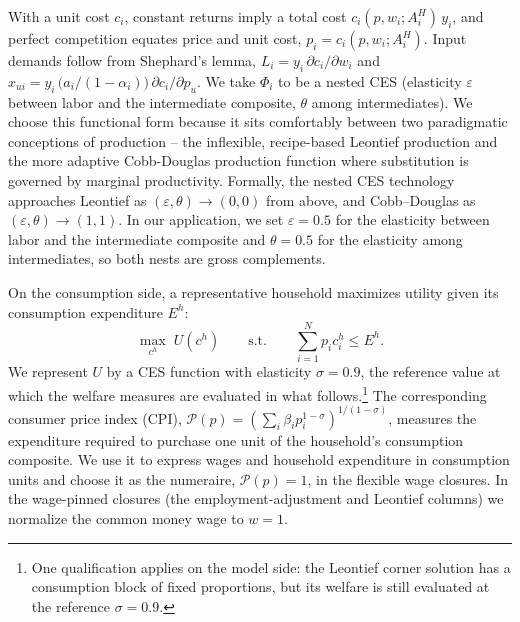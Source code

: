 With a unit cost $c_i$, constant returns imply a total cost
$c_i(p,w_i;A_i^{H})\,y_i$, and perfect competition
equates price and unit cost, $p_i = c_i(p,w_i;A_i^{H})$. Input demands follow
from Shephard's lemma, $L_i = y_i\,\partial c_i/\partial w_i$ and
$x_{ui} = y_i\,\bigl(a_i/(1-\alpha_i)\bigr)\,\partial c_i/\partial p_u$.
We take $\Phi_i$ to be a nested CES (elasticity $\varepsilon$ between labor and
the intermediate composite, $\theta$ among intermediates). We choose this functional form because it sits comfortably between two paradigmatic conceptions of production -- the inflexible, recipe-based Leontief production and the more adaptive Cobb-Douglas production function where substitution is governed by marginal productivity. Formally, the nested CES technology approaches Leontief as $(\varepsilon,\theta)\to(0,0)$ from above, and Cobb--Douglas as $(\varepsilon,\theta)\to(1,1)$.  In our application, we set $\varepsilon = 0.5$ for the elasticity between labor and the intermediate composite and $\theta = 0.5$ for the elasticity among intermediates, so both nests are gross complements.

On the consumption side, a representative household maximizes utility given its consumption expenditure $E^h$:
\begin{equation}
\max_{c^h} \; U(c^h)
\qquad \text{s.t.} \qquad \sum_{i=1}^N p_i c_i^h \leq E^h.
\label{eq:utility-max}
\end{equation}
We represent $U$ by a CES function with elasticity $\sigma = 0.9$, the reference value at which the welfare measures are evaluated in what follows.\footnote{One qualification applies on the model side: the Leontief corner solution has a consumption block of fixed proportions, but its welfare is still evaluated at the reference $\sigma = 0.9$.}
The corresponding consumer price index (CPI), $\mathcal{P}(p) = (\sum_i \beta_i p_i^{1-\sigma})^{1/(1-\sigma)}$, measures the expenditure required to purchase one unit of the household's consumption composite. We use it to express wages and household expenditure in consumption units and choose it as the numeraire, $\mathcal{P}(p)=1$, in the flexible wage closures.  In the wage-pinned closures (the employment-adjustment and Leontief columns) we normalize the common money wage to $w=1$.

